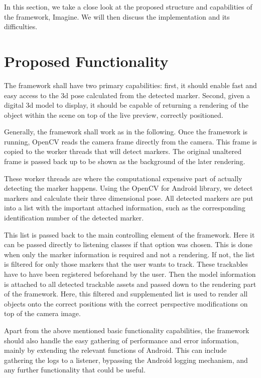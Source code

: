
In this section, we take a close look at the proposed structure and capabilities of the framework, Imagine.
We will then discuss the implementation and its difficulties.

\section{Proposed Functionality}

The framework shall have two primary capabilities: first, it should enable fast and easy access to the 3d pose calculated from the detected marker.
Second, given a digital 3d model to display, it should be capable of returning a rendering of the object within the scene on top of the live preview, correctly positioned.

Generally, the framework shall work as in the following.
Once the framework is running, OpenCV reads the camera frame directly from the camera.
This frame is copied to the worker threads that will detect markers.
The original unaltered frame is passed back up to be shown as the background of the later rendering.

These worker threads are where the computational expensive part of actually detecting the marker happens.
Using the OpenCV for Android library, we detect markers and calculate their three dimensional pose.
All detected markers are put into a list with the important attached information, such as the corresponding identification number of the detected marker.

This list is passed back to the main controlling element of the framework.
Here it can be passed directly to listening classes if that option was chosen.
This is done when only the marker information is required and not a rendering.
If not, the list is filtered for only those markers that the user wants to track.
These trackables have to have been registered beforehand by the user.
Then the model information is attached to all detected trackable assets and passed down to the rendering part of the framework.
Here, this filtered and supplemented list is used to render all objects onto the correct positions with the correct perspective modifications on top of the camera image.

Apart from the above mentioned basic functionality capabilities, the framework should also handle the easy gathering of performance and error information, mainly by extending the relevant functions of Android.
This can include gathering the logs to a listener, bypassing the Android logging mechanism, and any further functionality that could be useful.

